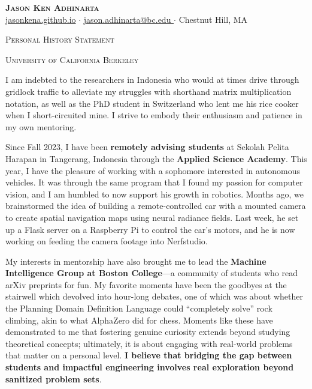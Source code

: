 \documentclass[letterpaper,11pt]{article}
\newcommand{\dualsectionold}[2]{%
  \noindent
    \parbox[b]{0.5\textwidth}{\raggedright\scshape\large #1}%
    \hfill
    \parbox[b]{0.5\textwidth}{\raggedleft\scshape\large #2}%
}
\newcommand{\dualsectionhline}{%
  \vspace{2pt}\color{black}\titlerule\vspace{-5pt}
}
\newcommand{\dualsection}[2]{%
  \dualsectionold{#1}{#2}%
  \vspace{-5pt}\dualsectionhline
}
\begin{document}
\justifying

\begin{center}
  \textbf{\Huge \scshape Jason Ken Adhinarta} \\ \vspace{3pt}
    \small
    \href{https://jasonkena.github.io}{jasonkena.github.io}
   \hspace{0.05cm}$\cdot$\hspace{0.05cm}
    \href{mailto:jason.adhinarta@bc.edu}{ jason.adhinarta@bc.edu }
   \hspace{0.05cm}$\cdot$\hspace{0.05cm}
    Chestnut Hill, MA
\end{center}


\dualsection{Personal History Statement}{University of California Berkeley}
\vspace{2pt}\color{black}\titlerule%

I am indebted to the researchers in Indonesia who would at times drive through gridlock traffic to alleviate my struggles with shorthand matrix multiplication notation, as well as the PhD student in Switzerland who lent me his rice cooker when I short-circuited mine. I strive to embody their enthusiasm and patience in my own mentoring.

Since Fall 2023, I have been \textbf{remotely advising students} at Sekolah Pelita Harapan in Tangerang, Indonesia through the \textbf{Applied Science Academy}. This year, I have the pleasure of working with a sophomore interested in autonomous vehicles. It was through the same program that I found my passion for computer vision, and I am humbled to now support his growth in robotics. Months ago, we brainstormed the idea of building a remote-controlled car with a mounted camera to create spatial navigation maps using neural radiance fields. Last week, he set up a Flask server on a Raspberry Pi to control the car’s motors, and he is now working on feeding the camera footage into Nerfstudio.

My interests in mentorship have also brought me to lead the \textbf{Machine Intelligence Group at Boston College}---a community of students who read arXiv preprints for fun. My favorite moments have been the goodbyes at the stairwell which devolved into hour-long debates, one of which was about whether the Planning Domain Definition Language could “completely solve” rock climbing, akin to what AlphaZero did for chess. Moments like these have demonstrated to me that fostering genuine curiosity extends beyond studying theoretical concepts; ultimately, it is about engaging with real-world problems that matter on a personal level. \textbf{I believe that bridging the gap between students and impactful engineering involves real exploration beyond sanitized problem sets}.
\end{document}
